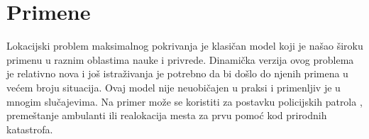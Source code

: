 \documentclass[a4paper]{article}
\begin{document}
\section{Primene}
Lokacijski problem maksimalnog pokrivanja je klasičan model koji je našao široku primenu u raznim oblastima nauke i privrede. Dinamička verzija ovog problema je relativno nova i još istraživanja je potrebno da bi došlo do njenih primena u većem broju situacija. Ovaj model nije neuobičajen u praksi i primenljiv je u mnogim slučajevima. Na primer može se koristiti za postavku policijskih patrola \cite{police}, premeštanje ambulanti \cite{ambulance} ili realokacija mesta za prvu pomoć kod prirodnih katastrofa.

\appendix
 

\end{document}
